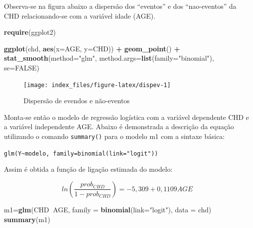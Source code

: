 \documentclass[12pt,brazil,oneside]{book}
\newenvironment{Shaded}{\begin{snugshade}}{\end{snugshade}}
\newcommand{\DataTypeTok}[1]{\textcolor[rgb]{0.13,0.29,0.53}{#1}}
\newcommand{\KeywordTok}[1]{\textcolor[rgb]{0.13,0.29,0.53}{\textbf{#1}}}
\newcommand{\NormalTok}[1]{#1}
\newcommand{\OperatorTok}[1]{\textcolor[rgb]{0.81,0.36,0.00}{\textbf{#1}}}
\newcommand{\OtherTok}[1]{\textcolor[rgb]{0.56,0.35,0.01}{#1}}
\newcommand{\StringTok}[1]{\textcolor[rgb]{0.31,0.60,0.02}{#1}}
\begin{document}
Observa-se na figura abaixo a dispersão dos ``eventos'' e dos ``nao-eventos'' da CHD relacionando-se com a variável idade (AGE).

\begin{Shaded}
\begin{Highlighting}[]
\KeywordTok{require}\NormalTok{(ggplot2)}

\KeywordTok{ggplot}\NormalTok{(chd, }\KeywordTok{aes}\NormalTok{(}\DataTypeTok{x=}\NormalTok{AGE, }\DataTypeTok{y=}\NormalTok{CHD)) }\OperatorTok{+}\StringTok{ }
\StringTok{  }\KeywordTok{geom_point}\NormalTok{() }\OperatorTok{+}\StringTok{ }
\StringTok{  }\KeywordTok{stat_smooth}\NormalTok{(}\DataTypeTok{method=}\StringTok{"glm"}\NormalTok{, }\DataTypeTok{method.args=}\KeywordTok{list}\NormalTok{(}\DataTypeTok{family=}\StringTok{"binomial"}\NormalTok{), }\DataTypeTok{se=}\OtherTok{FALSE}\NormalTok{)}
\end{Highlighting}
\end{Shaded}

\begin{figure}[H]

{\centering \texttt{[image: index\_files/figure-latex/dispev-1]} 

}

\caption{Dispersão de evendos e não-eventos}\label{fig:dispev}
\end{figure}

Monta-se então o modelo de regressão logística com a variável dependente CHD e a variável independente AGE. Abaixo é demonstrada a descrição da equação utilizando o comando \texttt{summary()} para o modelo m1 com a sintaxe básica:

\texttt{glm(Y\textasciitilde{}modelo,\ family=binomial(link="logit"))}

Assim é obtida a função de ligação estimada do modelo:

\[
ln\left (\frac{prob_{CHD}}{1-prob_{CHD}}  \right ) = - 5,309 + 0,1109AGE
\]

\begin{Shaded}
\begin{Highlighting}[]
\NormalTok{m1=}\KeywordTok{glm}\NormalTok{(CHD}\OperatorTok{~}\NormalTok{AGE, }\DataTypeTok{family =} \KeywordTok{binomial}\NormalTok{(}\DataTypeTok{link=}\StringTok{"logit"}\NormalTok{), }\DataTypeTok{data =}\NormalTok{ chd)}
\KeywordTok{summary}\NormalTok{(m1)}
\end{Highlighting}
\end{Shaded}
\end{document}
